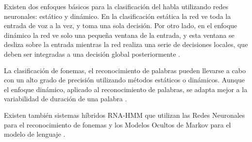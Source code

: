 Existen dos enfoques b\'asicos para la clasificaci\'on del habla utilizando redes neuronales: est\'atico y din\'amico. En la
clasificaci\'on est\'atica la red ve toda la entrada de voz a la vez, y toma una sola decisi\'on. Por otro lado, en el enfoque
din\'amico la red ve solo una peque\~na ventana de la entrada, y esta ventana se desliza sobre la entrada mientras la red
realiza una serie de decisiones locales, que deben ser integradas a una decisi\'on global posteriormente \cite{TebelskisSpeech1995}.

La clasificaci\'on de fonemas, el reconocimiento de palabras pueden llevarse a cabo con un alto
grado de precisi\'on utilizando m\'etodos est\'aticos o din\'amicos. Aunque el enfoque din\'amico, aplicado al reconocimiento de
palabras, se adapta mejor a la variabilidad de duraci\'on de una palabra \cite{TebelskisSpeech1995}.

Existen tambi\'en sistemas h\'ibridos RNA-HMM que utilizan las Redes Neuronales para el reconocimiento de fonemas y los Modelos
Ocultos de Markov para el modelo de lenguaje \cite{VimalaReview2012}.
